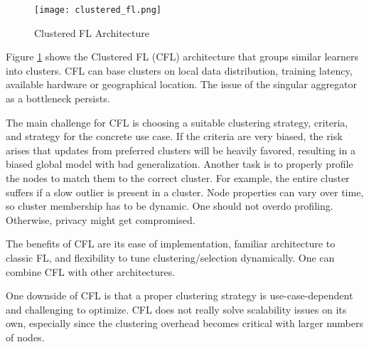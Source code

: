 \begin{figure}[h]
    \centering
    \texttt{[image: clustered\_fl.png]}
    \caption{Clustered FL Architecture}
    \label{fig:clustered_fl}
\end{figure}
Figure \ref{fig:clustered_fl} shows the Clustered FL (CFL) architecture
that groups similar learners into clusters.
CFL can base clusters on local data distribution, training latency,
available hardware or geographical location.
The issue of the singular aggregator as a bottleneck persists.

The main challenge for CFL is choosing a suitable clustering strategy, criteria,
and strategy for the concrete use case.
If the criteria are very biased, the risk arises that updates from preferred clusters
will be heavily favored, resulting in a biased global model with bad generalization.
Another task is to properly profile the nodes to match them to the correct cluster.
For example, the entire cluster suffers if a slow outlier is present in a cluster.
Node properties can vary over time, so cluster membership has to be dynamic.
One should not overdo profiling.
Otherwise, privacy might get compromised.

The benefits of CFL are its ease of implementation,
familiar architecture to classic FL,
and flexibility to tune clustering/selection dynamically.
One can combine CFL with other architectures.

One downside of CFL is that a proper clustering strategy is 
use-case-dependent and challenging to optimize.
CFL does not really solve scalability issues on its own,
especially since the clustering overhead becomes critical with larger numbers of nodes.


